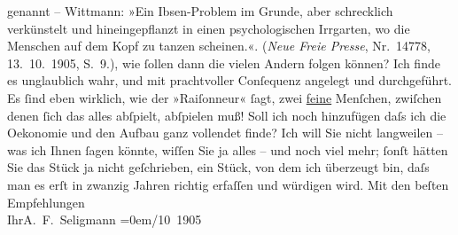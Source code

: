 \begin{ledgroupsized}[t]{13cm}
{{{                  genannt – Wittmann: »Ein Ibsen-Problem im Grunde, aber schrecklich
                     verkünstelt und hineingepflanzt in einen psychologischen Irrgarten, wo die
                     Menschen auf dem Kopf zu tanzen scheinen.«. (\emph{Neue Freie Presse}, Nr. 14778,
                        13. 10. 1905, S. 9.)}}}\label{K_L01563-1h}, wie ſollen dann die vielen
               Andern folgen können? Ich finde es unglaublich wahr, und mit prachtvoller Conſequenz
               angelegt und durchgeführt. Es ſind eben wirklich, wie der »Raiſonneur« ſagt, zwei
                  \uline{feine} Menſchen, zwiſchen denen ſich das alles
               abſpielt, abſpielen muß! Soll ich noch hinzufügen daſs ich die Oekonomie und den
               Aufbau ganz vollendet finde? Ich will Sie nicht langweilen – was ich Ihnen ſagen
               könnte, wiſſen Sie {\pb}ja alles – und noch viel mehr; ſonſt hätten Sie das
                  Stück ja nicht geſchrieben,
               ein Stück, von dem ich
               überzeugt bin, daſs man es erſt in zwanzig Jahren richtig erfaſſen und würdigen
               wird.\pend
           \pstart
           Mit den beſten Empfehlungen{\\[\baselineskip]}Ihr\spacefill\mbox{A. F. Seligmann}\pend
           \leftskip=0em{}/10 1905\pend
           
         
         \endnumbering{}\end{ledgroupsized}  \newcommand{\dateiname}{L01563}\newcommand{\titel}{Adalbert Seligmann an Arthur Schnitzler, 13. 10. 1905}\newcommand{\editorInnen}{Martin Anton Müller und Gerd-Hermann Susen}
      